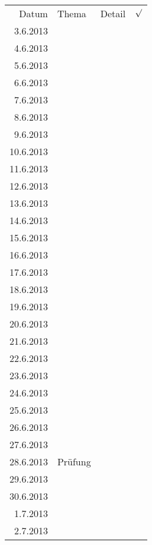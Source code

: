 \begin{tabular}{r l p{} l}
\rowcolor{lgray} Datum     & Thema         & Detail & $\surd$ \\
\rowcolor{white}  3.6.2013 &               &  &  \\
\rowcolor{lgray}  4.6.2013 &               &  &  \\
\rowcolor{white}  5.6.2013 &               &  &  \\
\rowcolor{lgray}  6.6.2013 &               &  &  \\
\rowcolor{white}  7.6.2013 &               &  &  \\
\rowcolor{lgray}  8.6.2013 &               &  &  \\
\rowcolor{white}  9.6.2013 &               &  &  \\
\rowcolor{lgray} 10.6.2013 &               &  &  \\
\rowcolor{white} 11.6.2013 &               &  &  \\
\rowcolor{lgray} 12.6.2013 &               &  &  \\
\rowcolor{white} 13.6.2013 &               &  &  \\
\rowcolor{lgray} 14.6.2013 &               &  &  \\
\rowcolor{white} 15.6.2013 &               &  &  \\
\rowcolor{lgray} 16.6.2013 &               &  &  \\
\rowcolor{white} 17.6.2013 &               &  &  \\
\rowcolor{lgray} 18.6.2013 &               &  &  \\
\rowcolor{white} 19.6.2013 &               &  &  \\
\rowcolor{lgray} 20.6.2013 &               &  &  \\
\rowcolor{white} 21.6.2013 &               &  &  \\
\rowcolor{lgray} 22.6.2013 &               &  &  \\
\rowcolor{white} 23.6.2013 &               &  &  \\
\rowcolor{lgray} 24.6.2013 &               &  &  \\
\rowcolor{white} 25.6.2013 &               &  &  \\
\rowcolor{lgray} 26.6.2013 &               &  &  \\
\rowcolor{white} 27.6.2013 &               &  &  \\
\rowcolor{lgray} 28.6.2013 & Prüfung       &  &  \\
\rowcolor{white} 29.6.2013 &               &  &  \\
\rowcolor{lgray} 30.6.2013 &               &  &  \\
\rowcolor{white}  1.7.2013 &               &  &  \\
\rowcolor{lgray}  2.7.2013 &               &  &  \\
\end{tabular}

